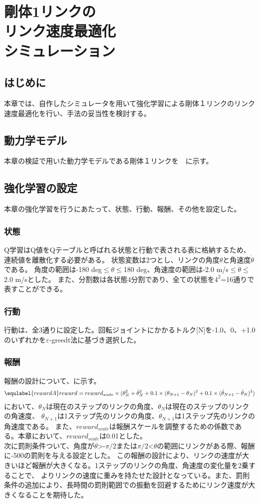 \chapter[剛体1リンクのリンク速度最適化シミュレーション]{剛体1リンクの\\リンク速度最適化\\シミュレーション}

\section{はじめに}
本章では、自作したシミュレータを用いて強化学習による剛体１リンクのリンク速度最適化を行い、手法の妥当性を検討する。
\section{動力学モデル}
本章の検証で用いた動力学モデルである剛体１リンクを　に示す。
\section{強化学習の設定}
本章の強化学習を行うにあたって、状態、行動、報酬、その他を設定した。
\subsection{状態}
Q学習はQ値をQテーブルと呼ばれる状態と行動で表される表に格納するため、連続値を離散化する必要がある。
状態変数は2つとし、リンクの角度$\theta$と角速度$\dot{\theta}$である。
角度の範囲は-180 deg$\leq$$\theta$$\leq$180 deg、角速度の範囲は-2.0 m/s$\leq$$\dot{\theta}$$\leq$2.0 m/sとした。
また、分割数は各状態4分割であり、全ての状態を$4^{2}$=16通りで表すことができる。
\subsection{行動}
行動は、全3通りに設定した。回転ジョイントにかかるトルク[N]を-1.0、0、+1.0のいずれかを$\varepsilon$-greedt法に基づき選択した。
\subsection{報酬}
報酬の設計について、に示す。
\begin{eqnarray}
  \equlabel{rewardA}
  reward=reward_{scale}\times(\theta_N^2+\dot{\theta}_N^2
  +0.1\times(\theta_{N+1}-\theta_N)^2
  +0.1\times(\dot{\theta}_{N+1}-\dot{\theta}_N)^2)
\end{eqnarray}
において、$\theta_N$は現在のステップのリンクの角度、$\dot{\theta}_N$は現在のステップのリンクの角速度、
$\theta_{N+1}$は1ステップ先のリンクの角度、$\dot{\theta}_{N+1}$は1ステップ先のリンクの角速度である。
また、$reward_{scale}$は報酬スケールを調整するための係数である。本章において、$reward_{scale}$は0.01とした。\\
次に罰則条件ついて、角度が$\theta$>-$\pi/2$または$\pi/2$<$\theta$の範囲にリンクがある際、報酬に-500の罰則を与える設定とした。
この報酬の設計により、リンクの速度が大きいほど報酬が大きくなる。1ステップのリンクの角度、角速度の変化量を2乗することで、
よりリンクの速度に重みを持たせた設計となっている。また、罰則条件の追加により、長時間の罰則範囲での振動を回避するためにリンク速度が大きくなることを期待した。
